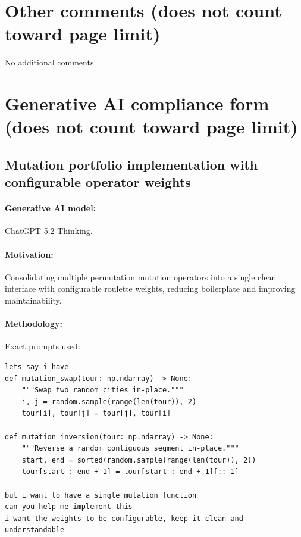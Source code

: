 \documentclass[a4paper,10pt]{article}
\begin{document}
\clearpage
\section{Other comments \hfill(does not count toward page limit)} \label{sec_other}

No additional comments.

\section{Generative AI compliance form \hfill(does not count toward page limit)} \label{sec_genai}

\subsection{Mutation portfolio implementation with configurable operator weights}

\paragraph{Generative AI model:} ChatGPT 5.2 Thinking.

\paragraph{Motivation:}
Consolidating multiple permutation mutation operators into a single clean interface with configurable roulette
weights, reducing boilerplate and improving maintainability.

\paragraph{Methodology:}
Exact prompts used:
\begin{lstlisting}
lets say i have
def mutation_swap(tour: np.ndarray) -> None:
    """Swap two random cities in-place."""
    i, j = random.sample(range(len(tour)), 2)
    tour[i], tour[j] = tour[j], tour[i]

def mutation_inversion(tour: np.ndarray) -> None:
    """Reverse a random contiguous segment in-place."""
    start, end = sorted(random.sample(range(len(tour)), 2))
    tour[start : end + 1] = tour[start : end + 1][::-1]

but i want to have a single mutation function
can you help me implement this
i want the weights to be configurable, keep it clean and understandable
\end{lstlisting}
\end{document}
